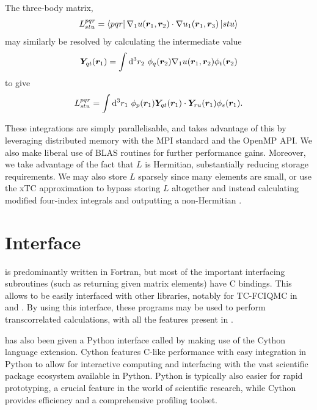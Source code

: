 The three-body matrix,
\begin{equation}
    L^{pqr}_{stu} = \bra{pqr}\nabla_1u(\bm r_1, \bm r_2)\cdot \nabla u_1(\bm r_1, \bm r_3)\ket{stu}
\end{equation}
may similarly be resolved by calculating the intermediate value
\begin{equation}
    \bm Y_{qt}(\bm r_1) = \int\mathrm{d}^3 r_2\ \phi_q(\bm r_2)\nabla_1u(\bm r_1, \bm r_2)\phi_t(\bm r_2)
\end{equation}
to give
\begin{equation}
    L^{pqr}_{stu} = \int\mathrm{d}^3 r_1\ \phi_p(\bm r_1)\bm Y_{qt}(\bm r_1)\cdot\bm Y_{ru}(\bm r_1)\phi_s(\bm r_1).
\end{equation}

These integrations are simply parallelisable, and \tchint takes advantage of this by leveraging distributed memory with the \gls{MPI}\supercite{mpi41,dalcinMPI2005,dalcinMPI2008,dalcinParallel2011} standard and the OpenMP\supercite{dagumOpenMP1998} \gls{API}. We also make liberal use of BLAS\supercite{blackford2002updated} routines for further performance gains. Moreover, we take advantage of the fact that $L$ is Hermitian, substantially reducing storage requirements. We may also store $L$ sparsely since many elements are small, or use the \gls{xTC} approximation to bypass storing $L$ altogether and instead calculating modified four-index integrals and outputting a non-Hermitian \fcidump.

\section{Interface}

\tchint is predominantly written in Fortran, but most of the important interfacing subroutines (such as returning given matrix elements) have C bindings. This allows \tchint to be easily interfaced with other libraries, notably for \gls{TC}-\gls{FCIQMC} in \neci\supercite{gutherNECI2020} and \mseven.\supercite{andersonRobertanderson2024} By using this interface, these programs may be used to perform transcorrelated calculations, with all the features present in \tchint.

\tchint has also been given a Python interface called \pytchint by making use of the Cython language extension.\supercite{behnel2008cython,behnel2011cython,smithCython2015} Cython features C-like performance with easy integration in Python to allow for interactive computing and interfacing with the vast scientific package ecosystem available in Python. Python is typically also easier for rapid prototyping, a crucial feature in the world of scientific research, while Cython provides efficiency and a comprehensive profiling toolset.

